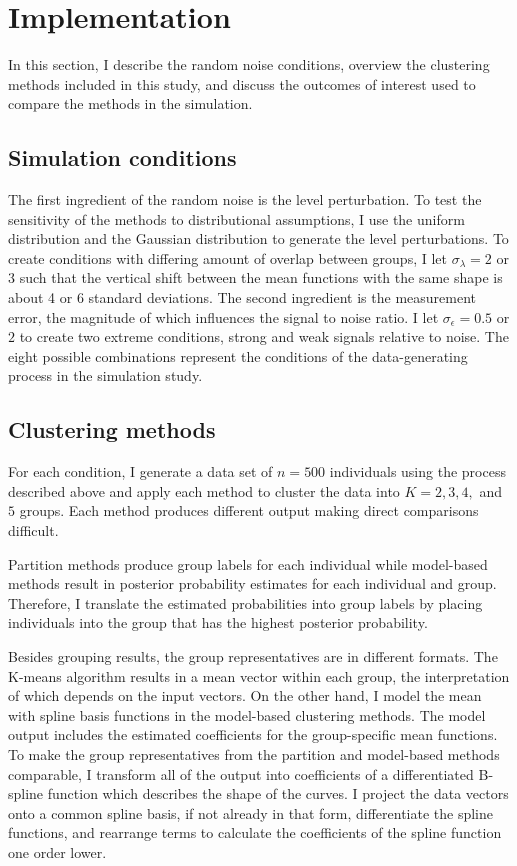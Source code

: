 \section{Implementation}
In this section, I describe the random noise conditions, overview the clustering methods included in this study, and discuss the outcomes of interest used to compare the methods in the simulation. 

\subsection{Simulation conditions}
The first ingredient of the random noise is the level perturbation.  To test the sensitivity of the methods to distributional assumptions, I use the uniform distribution and the Gaussian distribution to generate the level perturbations. To create conditions with differing amount of overlap between groups, I let $\sigma_{\lambda}=2$ or $3$ such that the vertical shift between the mean functions with the same shape is about 4 or 6 standard deviations. The second ingredient is the measurement error, the magnitude of which influences the signal to noise ratio. I let $\sigma_{\epsilon}=0.5$ or $2$ to create two extreme conditions, strong and weak signals relative to noise. The eight possible combinations represent the conditions of the data-generating process in the simulation study. 

\subsection{Clustering methods}
For each condition, I generate a data set of $n=500$ individuals using the process described above and apply each method to cluster the data into $K=2,3,4,$ and $5$ groups. Each method produces different output making direct comparisons difficult. 

Partition methods produce group labels for each individual while model-based methods result in posterior probability estimates for each individual and group. Therefore, I translate the estimated probabilities into group labels by placing individuals into the group that has the highest posterior probability.

Besides grouping results, the group representatives are in different formats. The K-means algorithm results in a mean vector within each group, the interpretation of which depends on the input vectors. On the other hand, I model the mean with spline basis functions in the model-based clustering methods. The model output includes the estimated coefficients for the group-specific mean functions. To make the group representatives from the partition and model-based methods comparable, I transform all of the output into coefficients of a differentiated B-spline function which describes the shape of the curves. I project the data vectors onto a common spline basis, if not already in that form, differentiate the spline functions, and rearrange terms to calculate the coefficients of the spline function one order lower. 

